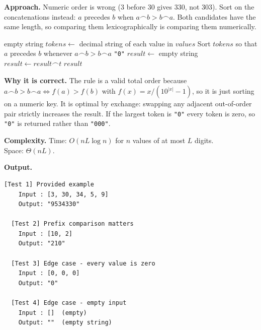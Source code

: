 \documentclass[11pt]{article}
\begin{document}
\textbf{Approach.} Numeric order is wrong ($3$ before $30$ gives 330, not 303). Sort on the concatenations instead: $a$ precedes $b$ when $a\frown b > b\frown a$. Both candidates have the same length, so comparing them lexicographically is comparing them numerically.

\begin{algorithm}[H]
\caption{Largest Number From Concatenation}
\begin{algorithmic}[1]
        \State \Return empty string
    \EndIf
    \State $tokens \gets$ decimal string of each value in $values$
    \State Sort $tokens$ so that $a$ precedes $b$ whenever $a \frown b > b \frown a$
        \State \Return \texttt{"0"} 
    \EndIf
    \State $result \gets$ empty string
        \State $result \gets result \frown t$
    \EndFor
    \State \Return $result$
\EndFunction
\end{algorithmic}
\end{algorithm}

\textbf{Why it is correct.} The rule is a valid total order because $a\frown b > b\frown a \Leftrightarrow f(a) > f(b)$ with $f(x)=x/(10^{|x|}-1)$, so it is just sorting on a numeric key. It is optimal by exchange: swapping any adjacent out-of-order pair strictly increases the result. If the largest token is \texttt{"0"} every token is zero, so \texttt{"0"} is returned rather than \texttt{"000"}.

\textbf{Complexity.} Time: $O(nL\log n)$ for $n$ values of at most $L$ digits.\\
Space: $\Theta(nL)$.

\textbf{Output.}

\begin{lstlisting}[style=term]
  [Test 1] Provided example
    Input : [3, 30, 34, 5, 9]
    Output: "9534330"

  [Test 2] Prefix comparison matters
    Input : [10, 2]
    Output: "210"

  [Test 3] Edge case - every value is zero
    Input : [0, 0, 0]
    Output: "0"

  [Test 4] Edge case - empty input
    Input : []  (empty)
    Output: ""  (empty string)
\end{lstlisting}

\newpage

\end{document}
